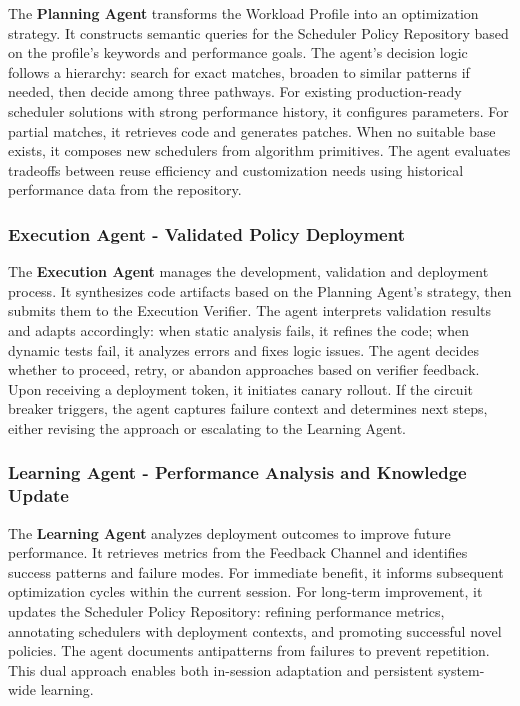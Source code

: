 The \textbf{Planning Agent} transforms the Workload Profile into an optimization strategy. It constructs semantic queries for the Scheduler Policy Repository based on the profile's keywords and performance goals. The agent's decision logic follows a hierarchy: search for exact matches, broaden to similar patterns if needed, then decide among three pathways. For existing production-ready scheduler solutions with strong performance history, it configures parameters. For partial matches, it retrieves code and generates patches. When no suitable base exists, it composes new schedulers from algorithm primitives. The agent evaluates tradeoffs between reuse efficiency and customization needs using historical performance data from the repository.

\subsubsection{Execution Agent - Validated Policy Deployment}

The \textbf{Execution Agent} manages the development, validation and deployment process. It synthesizes code artifacts based on the Planning Agent's strategy, then submits them to the Execution Verifier. The agent interprets validation results and adapts accordingly: when static analysis fails, it refines the code; when dynamic tests fail, it analyzes errors and fixes logic issues. The agent decides whether to proceed, retry, or abandon approaches based on verifier feedback. Upon receiving a deployment token, it initiates canary rollout. If the circuit breaker triggers, the agent captures failure context and determines next steps, either revising the approach or escalating to the Learning Agent.

\subsubsection{Learning Agent - Performance Analysis and Knowledge Update}

The \textbf{Learning Agent} analyzes deployment outcomes to improve future performance. It retrieves metrics from the Feedback Channel and identifies success patterns and failure modes. For immediate benefit, it informs subsequent optimization cycles within the current session. For long-term improvement, it updates the Scheduler Policy Repository: refining performance metrics, annotating schedulers with deployment contexts, and promoting successful novel policies. The agent documents antipatterns from failures to prevent repetition. This dual approach enables both in-session adaptation and persistent system-wide learning.


